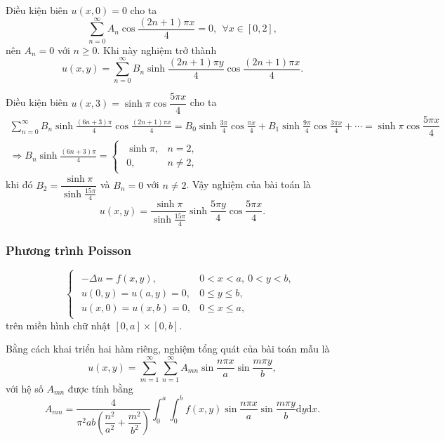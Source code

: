 \documentclass[10pt, a4paper]{article}
\begin{document}
	Điều kiện biên $u(x,0)=0$ cho ta $$\sum_{n=0}^\infty A_n\cos\frac{(2n+1)\pi x}{4}=0,~~\forall x\in[0,2],$$
	nên $A_n=0$ với $n\ge0$. Khi này nghiệm trở thành $$u(x,y)=\sum_{n=0}^\infty B_n\sinh\frac{(2n+1)\pi y}{4}\cos\frac{(2n+1)\pi x}{4}.$$
	
	Điều kiện biên $u(x,3)=\sinh\pi\cos\dfrac{5\pi x}{4}$ cho ta \begin{gather*}
		\sum_{n=0}^\infty B_n\sinh\frac{(6n+3)\pi}{4}\cos\frac{(2n+1)\pi x}{4}=B_0\sinh\frac{3\pi}{4}\cos\frac{\pi x}{4}+B_1\sinh\frac{9\pi}{4}\cos\frac{3\pi x}{4}+\cdots=\sinh\pi\cos\dfrac{5\pi x}{4}\\
		\Rightarrow B_n\sinh\frac{(6n+3)\pi}{4}=\begin{cases}
			\begin{array}{ll}
				\sinh\pi, & n=2, \\
				0, & n\ne2,
			\end{array}
		\end{cases}
	\end{gather*}
	khi đó $B_2=\dfrac{\sinh\pi}{\sinh\frac{15\pi}{4}}$ và $B_n=0$ với $n\ne2$. Vậy nghiệm của bài toán là $$u(x,y)=\dfrac{\sinh\pi}{\sinh\frac{15\pi}{4}}\sinh\frac{5\pi y}{4}\cos\frac{5\pi x}{4}.$$
	\subsubsection{Phương trình Poisson}
	\vspace{2mm}
	\begin{tcolorbox}[enhanced,colback=blue!5!white,colframe=blue!75!black,sharp corners=all,shadow={0mm}{0mm}{-1.5mm}%
		{fill=blue!75!red,opacity=0.3},title=\textbf{Dạng mẫu của bài toán}]
		$$\begin{cases}
			\begin{array}{ll}
				-\Delta u=f(x,y), & 0<x<a,~0<y<b,\\
				u(0,y)=u(a,y)=0, & 0\le y\le b,\\
				u(x,0)=u(x,b)=0, & 0\le x\le a,
			\end{array}
		\end{cases}$$
		trên miền hình chữ nhật $[0,a]\times[0,b]$.
	\end{tcolorbox}
	\vspace{2mm}
	Bằng cách khai triển hai hàm riêng, nghiệm tổng quát của bài toán mẫu là $$u(x,y)=\sum_{m=1}^\infty\sum_{n=1}^\infty A_{mn}\sin\frac{n\pi x}{a}\sin\frac{m\pi y}{b},$$
	với hệ số $A_{mn}$ được tính bằng $$A_{mn}=\frac{4}{\pi^2ab\left(\dfrac{n^2}{a^2}+\dfrac{m^2}{b^2}\right)}\int_0^a\int_0^bf(x,y)\sin\frac{n\pi x}{a}\sin\frac{m\pi y}{b}\text{d}y\text{d}x.$$
	
\end{document}
